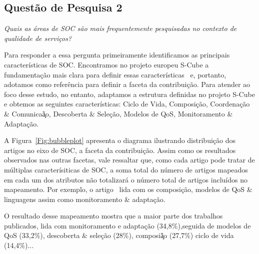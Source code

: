 \subsection{Quest\~{a}o de Pesquisa 2}
\emph{Quais as áreas de SOC são mais frequentemente pesquisadas no contexto de qualidade de serviços?}


Para responder a essa pergunta primeiramente identificamos as principais caracter\'{i}sticas de SOC. Encontramos no projeto europeu S-Cube a fundamenta\c{c}\~{a}o mais clara para definir essas caracter\'{i}sticas~\cite{SCube-FINALREPORT} e, portanto, adotamos como refer\^{e}ncia para definir a faceta da contribui\c{c}\~{a}o. Para atender ao foco desse estudo, no entanto, adaptamos a estrutura definidas no projeto S-Cube e obtemos as seguintes caracter\'{i}sticas: Ciclo de Vida, Composi\c{c}\~{a}o, Coordena\c{c}\~{a}o \& Comunica\c\~{a}o, Descoberta \& Sele\c{c}\~{a}o, Modelos de QoS, Monitoramento \& Adapta\c{c}\~{a}o. 

A Figura~\ref{Fig:bubbleplot} apresenta o diagrama ilustrando distribui\c{c}\~{a}o dos artigos no eixo de SOC, a faceta da contribui\c{c}\~{a}o. Assim como os resultados observados nas outras facetas, vale ressaltar que, como cada artigo pode tratar de m\'{u}ltiplas caracter\'{i}siticas de SOC, a soma total do n\'{u}mero de artigos mapeados em cada um dos atributos n\~{a}o totalizar\'{a} o n\'{u}mero total de artigos inclu\'{i}dos no mapeamento. Por exemplo, o artigo~\cite{A QoS-aware fault tolerant middleware for dependable service composition} lida com os composi\c{c}\~{a}o, modelos de QoS \& linguagens assim como monitoramento \& adapta\c{c}\~{a}o. 

O resultado desse mapeamento mostra que a maior parte dos trabalhos publicados, lida com monitoramento e adapta\c{c}\~{a}o (34,8\%),seguida de modelos de QoS (33,2\%), descoberta \& sele\c{c}\~{a}o (28\%),  composi\c\~{a}o (27,7\%) ciclo de vida (14,4\%)...

